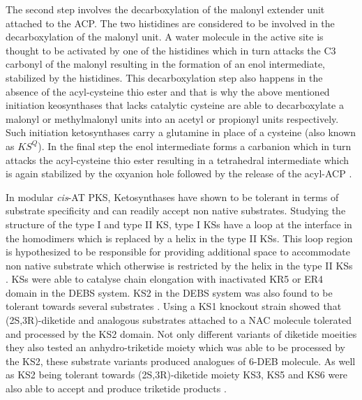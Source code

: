 			The second step involves the decarboxylation of the malonyl extender unit attached to the ACP. The two histidines are considered to be involved in the decarboxylation of the malonyl unit. A water molecule in the active site is thought to be activated by one of the histidines which in turn attacks the C3 carbonyl of the malonyl resulting in the formation of an enol intermediate, stabilized by the histidines. This decarboxylation step also happens in the absence of the acyl-cysteine thio ester and that is why the above mentioned initiation keosynthases that lacks catalytic cysteine are able to decarboxylate a malonyl or methylmalonyl units into an acetyl or propionyl units respectively. Such initiation ketosynthases carry a glutamine in place of a cysteine (also known as $ KS^{Q} $). In the final step the enol intermediate forms a carbanion which in turn attacks the acyl-cysteine thio ester resulting in a tetrahedral intermediate which is again stabilized by the oxyanion hole followed by the release of the acyl-ACP \parencite{Heath2002}. 
			
			In modular \textit{cis}-AT PKS, Ketosynthases have shown to be tolerant in terms of substrate specificity and can readily accept non native substrates. Studying the structure of the type I and type II KS, type I KSs have a loop at the interface in the homodimers which is replaced by a helix in the type II KSs. This loop region is hypothesized to be responsible for providing additional space to accommodate non native substrate which otherwise is restricted by the helix in the type II KSs \parencite{Pan2002}. KSs were able to catalyse chain elongation with inactivated KR5 or ER4 domain in the DEBS system. KS2 in the DEBS system was also found to be tolerant towards several substrates \parencite{Khosla1999}. Using a KS1 knockout strain  \textcite{Khosla1999} showed that (2S,3R)-diketide  and analogous substrates attached to a NAC molecule tolerated and processed by the KS2 domain. Not only different variants of diketide moeities they also tested an anhydro-triketide moiety which was able to be processed by the KS2, these substrate variants produced analogues of 6-DEB molecule. As well as KS2 being tolerant towards (2S,3R)-diketide moiety KS3, KS5 and KS6 were also able to accept and produce triketide products \parencite{Khosla1999}. 
			
